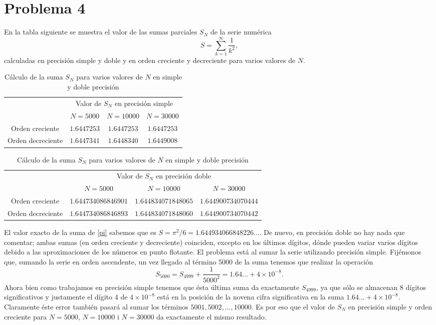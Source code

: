 \documentclass[a4paper]{article}
\begin{document}
\section*{Problema 4}
En la tabla siguiente se muestra el valor de las sumas parciales $S_N$ de la serie numérica 
\begin{equation}
    S=\sum_{k=1}^\infty\frac{1}{k^2},
    \label{pi}
\end{equation} calculadas en precisión simple y doble y en orden creciente y decreciente para varios valores de $N$.\par
\begin{table}[ht]
	\centering
	\begin{tabular}{|c|c|c|c|}
	    \hline
	    & \multicolumn{3}{c|}{Valor de $S_N$ en precisión simple} \\
		\cline{2-4} 
		& $N=5000$ & $N=10000$ & $N=30000$\\
		\hline
		Orden creciente  & $1.6447253$ & $1.6447253$ & $1.6447253$ \\
		\hline
		Orden decreciente  & $1.6447341$ & $1.6448340$  & $1.6449008$ \\
		\hline
	\end{tabular}\vspace{5pt}
	\begin{tabular}{|c|c|c|c|}
	\hline
	    & \multicolumn{3}{c|}{Valor de $S_N$ en precisión doble}\\
		\cline{2-4} 
		& $N=5000$ & $N=10000$ & $N=30000$ \\
		\hline
		Orden creciente & $1.644734086846901$ & $1.644834071848065$ & $1.644900734070444$ \\
		\hline
		Orden decreciente & $1.644734086846893$ & $1.644834071848060$ & $1.644900734070442$\\
		\hline
	\end{tabular}
		\caption{Cálculo de la suma $S_N$ para varios valores de $N$ en simple y doble precisión}
		\label{tab:4}
	\end{table}
El valor exacto de la suma de \eqref{pi} sabemos que es $S=\pi^2/6=1.644934066848226...$.  De nuevo, en precisión doble no hay nada que comentar; ambas sumas (en orden creciente y decreciente) coinciden, excepto en los últimos dígitos, dónde pueden variar varios dígitos debido a las aproximaciones de los números en punto flotante. El problema está al sumar la serie utilizando precisión simple. Fijémonos que, sumando la serie en orden ascendente, un vez llegado al término 5000 de la suma tenemos que realizar la operación $$S_{5000}=S_{4999}+\frac{1}{5000^2}=1.64...+4\times10^{-8}.$$ Ahora bien como trabajamos en precisión simple tenemos que ésta última suma da exactamente $S_{4999}$, ya que sólo se almacenan 8 dígitos significativos y justamente el dígito 4 de $4\times10^{-8}$ está en la posición de la novena cifra significativa en la suma $1.64...+4\times10^{-8}$. Claramente éste error también pasará al sumar los términos $5001,5002,\ldots,10000$. Es por eso que el valor de $S_N$ en precisión simple y orden creciente para $N=5000$, $N=10000$ i $N=30000$ da exactamente el mismo resultado.\par 
\end{document}
